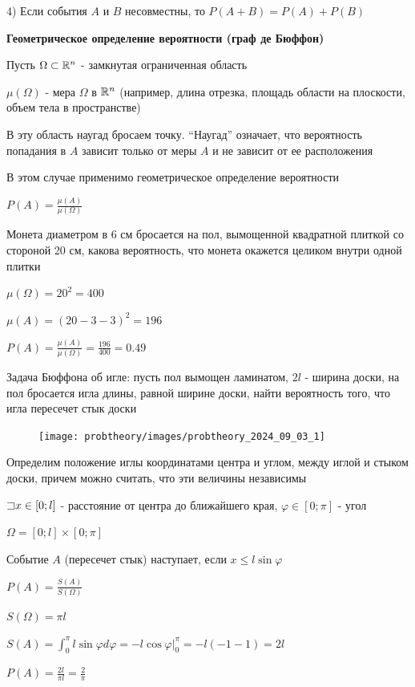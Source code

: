 \documentclass[12pt]{article}
\begin{document}
    4) Если события $A$ и $B$ несовместны, то $P(A + B) = P(A) + P(B)$

    \mediumvspace

    \hypertarget{geometricdefinitionofprobability}{}

    \textbf{Геометрическое определение вероятности (граф де Бюффон)}

    Пусть $\Omega \subset \mathbb{R}^n$ - замкнутая ограниченная область

    $\mu(\Omega)$ - мера $\Omega$ в $\mathbb{R}^n$ (например, длина отрезка, площадь области на плоскости, объем тела в пространстве)

    В эту область наугад бросаем точку. \enquote{Наугад} означает, что вероятность попадания в $A$ зависит только от меры $A$ и не зависит от ее расположения

    В этом случае применимо геометрическое определение вероятности

    $P(A) = \frac{\mu(A)}{\mu(\Omega)}$

     Монета диаметром в 6 см бросается на пол, вымощенной квадратной плиткой со стороной 20 см, какова вероятность,
    что монета окажется целиком внутри одной плитки

    $\mu(\Omega) = 20^2 = 400$

    $\mu(A) = (20 - 3 - 3)^2 = 196$

    $P(A) = \frac{\mu(A)}{\mu(\Omega)} = \frac{196}{400} = 0.49$

    \hypertarget{buffonsproblem}{}

     Задача Бюффона об игле: пусть пол вымощен ламинатом, $2l$ - ширина доски, на пол бросается игла длины, равной ширине доски,
    найти вероятность того, что игла пересечет стык доски

    \smallvspace

    \begin{minipage}{\linewidth}
        \begin{figure}
            \texttt{[image: probtheory/images/probtheory\_2024\_09\_03\_1]}
        \end{figure}

        Определим положение иглы координатами центра и углом, между иглой и стыком доски, причем можно считать, что эти величины независимы

        $\mathord{\sqsupset} x \in [0; l]$ - расстояние от центра до ближайшего края, $\varphi \in [0; \pi]$ - угол

        $\Omega = [0; l] \times [0; \pi]$

        Событие $A$ (пересечет стык) наступает, если $x \leq l \sin \varphi$

        $P(A) = \frac{S(A)}{S(\Omega)}$

        $S(\Omega) = \pi l$

        $S(A) = \int_0^\pi l \sin \varphi d\varphi = -l \cos \varphi \Big|_0^\pi = -l (-1 - 1) = 2l$

        $P(A) = \frac{2l}{\pi l} = \frac{2}{\pi}$
    \end{minipage}
\end{document}
